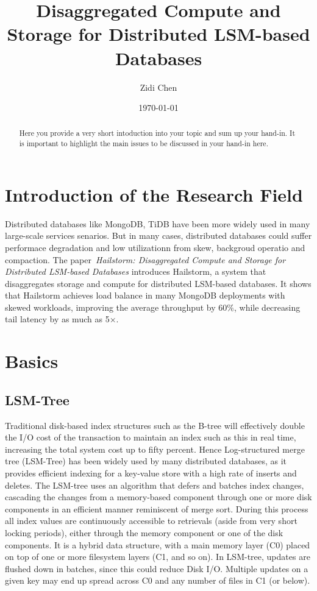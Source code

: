 \documentclass[a4paper,10pt,twoside]{article}
\title{Disaggregated Compute and Storage for Distributed LSM-based Databases}
\author{Zidi Chen}
\date{\today}
\begin{document}
\maketitle

\begin{abstract}
Here you provide a very short intoduction into your topic and sum up your hand-in. 
It is important to highlight the main issues to be discussed in your hand-in here.
\end{abstract}

\tableofcontents

\section{Introduction of the Research Field}

Distributed databases like MongoDB, TiDB have been more widely used in many large-scale services senarios.
But in many cases, distributed databases could suffer performace degradation and low utilizationn from skew, backgroud operatio and compaction.
The paper~\textit{Hailstorm: Disaggregated Compute and Storage for Distributed LSM-based Databases} \cite{mainpaper}introduces Hailstorm, a system that disaggregates storage and compute for distributed LSM-based databases.
It shows that Hailstorm achieves load balance in many MongoDB deployments with skewed workloads, improving the average throughput by 60$\%$, while decreasing tail latency by as much as 5×.



\section{Basics}

\subsection{LSM-Tree}

Traditional disk-based index structures such as the B-tree will effectively double the I/O cost of the transaction to maintain an index such as this in real time, increasing the total system cost up to fifty percent. 
Hence Log-structured merge tree (LSM-Tree) has been widely used by many distributed databases, as it provides efficient indexing for a key-value store with a high rate of inserts and deletes.
The LSM-tree uses an algorithm that defers and batches index changes, cascading the changes from a memory-based component through one or more disk components in an efficient manner reminiscent of merge sort. 
During this process all index values are continuously accessible to retrievals (aside from very short locking periods), either through the memory component or one of the disk components.
It is a hybrid data structure, with a main memory layer (C0) placed on top of one or more filesystem layers (C1, and so on). 
In LSM-tree, updates are flushed down in batches, since this could reduce Disk I/O. 
Multiple updates on a given key may end up spread across C0 and any number of files in C1 (or below). 
\end{document}

